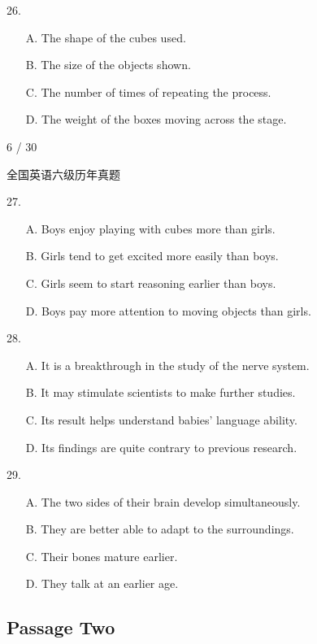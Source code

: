 \documentclass[UTF8,11pt]{ctexart}
\begin{document}
26.


\begin{itemize}[leftmargin=2em,itemsep=.2em,topsep=.4em]\item[A.] The shape of the cubes used.
\item[B.] The size of the objects shown.
\item[C.] The number of times of repeating the process.
\item[D.] The weight of the boxes moving across the stage.
\end{itemize}

6 / 30


全国英语六级历年真题


27.


\begin{itemize}[leftmargin=2em,itemsep=.2em,topsep=.4em]\item[A.] Boys enjoy playing with cubes more than girls.
\item[B.] Girls tend to get excited more easily than boys.
\item[C.] Girls seem to start reasoning earlier than boys.
\item[D.] Boys pay more attention to moving objects than girls.
\end{itemize}

28.


\begin{itemize}[leftmargin=2em,itemsep=.2em,topsep=.4em]\item[A.] It is a breakthrough in the study of the nerve system.
\item[B.] It may stimulate scientists to make further studies.
\item[C.] Its result helps understand babies' language ability.
\item[D.] Its findings are quite contrary to previous research.
\end{itemize}

29.


\begin{itemize}[leftmargin=2em,itemsep=.2em,topsep=.4em]\item[A.] The two sides of their brain develop simultaneously.
\item[B.] They are better able to adapt to the surroundings.
\item[C.] Their bones mature earlier.
\item[D.] They talk at an earlier age.
\end{itemize}

\subsection*{\textbf{Passage Two}}
\end{document}
